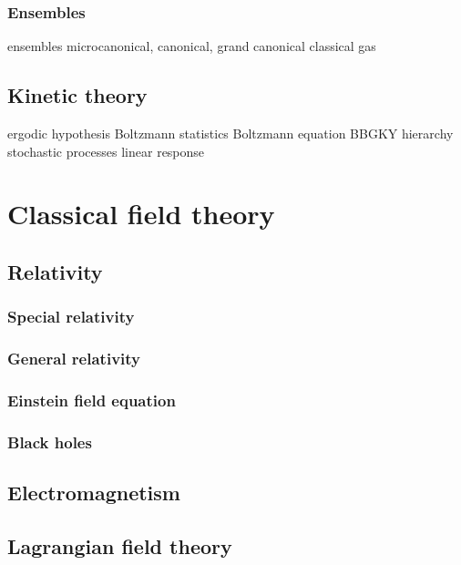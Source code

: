 \documentclass{../note}
\begin{document}
\section{Ensembles}
ensembles
microcanonical, canonical, grand canonical
classical gas

\chapter{Kinetic theory}
ergodic hypothesis
Boltzmann statistics
Boltzmann equation
BBGKY hierarchy
stochastic processes
linear response

\chapter{}
\chapter{}



\part{Classical field theory}
\chapter{Relativity}
\section{Special relativity}
\section{General relativity}
\section{Einstein field equation}
\section{Black holes}

\chapter{Electromagnetism}

\chapter{Lagrangian field theory}
\end{document}
